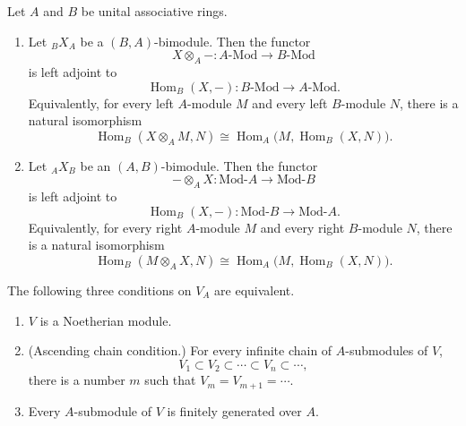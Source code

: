 \begin{theorem}
\label{thm:tensor-hom-adjunction}
Let \(A\) and \(B\) be unital associative rings.

\begin{enumerate}
    \item[(i)] Let \({}_B X_A\) be a \((B,A)\)-bimodule. Then the functor
    \[
    X\otimes_A -: A\text{-}\mathrm{Mod}\longrightarrow B\text{-}\mathrm{Mod}
    \]
    is left adjoint to
    \[
    \operatorname{Hom}_B(X,-):B\text{-}\mathrm{Mod}
    \longrightarrow A\text{-}\mathrm{Mod}.
    \]
    Equivalently, for every left \(A\)-module \(M\) and every left
    \(B\)-module \(N\), there is a natural isomorphism
    \[
    \operatorname{Hom}_B(X\otimes_A M,N)
    \cong
    \operatorname{Hom}_A\bigl(M,\operatorname{Hom}_B(X,N)\bigr).
    \]

    \item[(ii)] Let \({}_A X_B\) be an \((A,B)\)-bimodule. Then the functor
    \[
    -\otimes_A X:\mathrm{Mod}\text{-}A\longrightarrow \mathrm{Mod}\text{-}B
    \]
    is left adjoint to
    \[
    \operatorname{Hom}_B(X,-):\mathrm{Mod}\text{-}B
    \longrightarrow \mathrm{Mod}\text{-}A.
    \]
    Equivalently, for every right \(A\)-module \(M\) and every right
    \(B\)-module \(N\), there is a natural isomorphism
    \[
    \operatorname{Hom}_B(M\otimes_A X,N)
    \cong
    \operatorname{Hom}_A\bigl(M,\operatorname{Hom}_B(X,N)\bigr).
    \]
\end{enumerate}
\end{theorem}




\begin{theorem}
    The following three conditions on $V_A$ are equivalent.
    \begin{enumerate}
        \item[(1)] $V$ is a Noetherian module.
        \item[(2)] (Ascending chain condition.) For every infinite chain of $A$-submodules of $V$,
        \begin{equation}\tag{2.1}
            V_1 \subset V_2 \subset \cdots \subset V_n \subset \cdots,
        \end{equation}
        there is a number $m$ such that $V_m = V_{m+1} = \cdots$.
        \item[(3)] Every $A$-submodule of $V$ is finitely generated over $A$.
    \end{enumerate}
\end{theorem}

